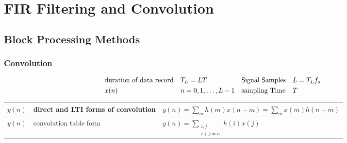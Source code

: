 \section{FIR Filtering and Convolution}
\subsection{Block Processing Methods}
\subsubsection{Convolution}

\begin{align}
& \text{duration of data record} && T_L=LT && \text{Signal Samples} && L=T_Lf_s \notag \\
& x(n) && n=0,1,\ldots,L-1 && \text{sampling Time} && T \notag
\end{align}

\begin{tabular}{|l|l|l|}
	\hline
	$y(n)$		& direct and LTI forms of convolution	& $y(n)=\sum\limits_m h(m)x(n-m)=\sum\limits_m x(m)h(n-m)$
	\\ \hline
	$y(n)$		& convolution table form				& $y(n)=\sum\limits_{\substack{i,j \\ i+j=n}} h(i)x(j)$
	\\ \hline
\end{tabular}

\newpage

